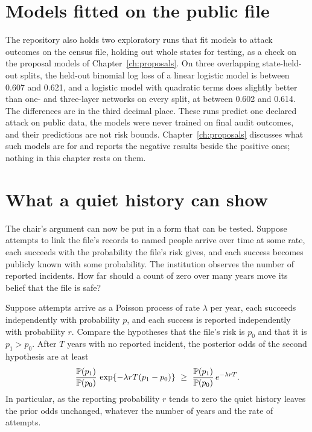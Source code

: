 \section{Models fitted on the public file}

The repository also holds two exploratory runs that fit models to attack outcomes on
the census file, holding out whole states for testing, as a check on the proposal models
of Chapter~\ref{ch:proposals}. On three overlapping state-held-out splits, the held-out
binomial log loss of a linear logistic model is between 0.607 and 0.621, and a logistic
model with quadratic terms does slightly better than one- and three-layer networks on
every split, at between 0.602 and 0.614.
The differences are in the third decimal place. These runs predict one declared attack on
public data, the models were never trained on final audit outcomes, and their predictions
are not risk bounds. Chapter~\ref{ch:proposals} discusses what such models are for and
reports the negative results beside the positive ones; nothing in this chapter rests on
them.

\section{What a quiet history can show}\label{c12:sec-silence}

The chair's argument can now be put in a form that can be tested. Suppose attempts to
link the file's records to named people arrive over time at some rate, each succeeds
with the probability the file's risk gives, and each success becomes publicly known with
some probability. The institution observes the number of reported incidents. How far
should a count of zero over many years move its belief that the file is safe?

\begin{proposition}\label{c12:prop-silence}
Suppose attempts arrive as a Poisson process of rate $\lambda$ per year, each succeeds
independently with probability $p$, and each success is reported independently with
probability $r$. Compare the hypotheses that the file's risk is $p_0$ and that it is
$p_1 > p_0$. After $T$ years with no reported incident, the posterior odds of the second
hypothesis are at least
\begin{equation}\label{c12:eq-silence}
\frac{\mathbb{P}(p_1)}{\mathbb{P}(p_0)}\,\exp\{-\lambda r T (p_1 - p_0)\}
\ \ge\ \frac{\mathbb{P}(p_1)}{\mathbb{P}(p_0)}\,e^{-\lambda r T}.
\end{equation}
In particular, as the reporting probability $r$ tends to zero the quiet history leaves
the prior odds unchanged, whatever the number of years and the rate of attempts.
\end{proposition}

